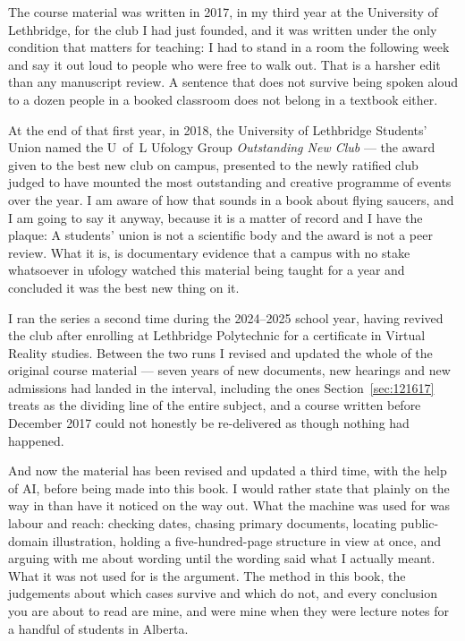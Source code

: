  The course material was written in 2017, in my
third year at the University of Lethbridge, for the club I had just founded, and it was written
under the only condition that matters for teaching: I had to stand in a room the following week
and say it out loud to people who were free to walk out. That is a harsher edit than any
manuscript review. A sentence that does not survive being spoken aloud to a dozen people in a
booked classroom does not belong in a textbook either.

At the end of that first year, in 2018, the University of Lethbridge Students' Union named the
U~of~L Ufology Group \emph{Outstanding New Club} --- the award given to the best new club on
campus, presented to the newly ratified club judged to have mounted the most outstanding and
creative programme of events over the year. I am aware of how that sounds in a book about flying
saucers, and I am going to say it anyway, because it is a matter of record and I have the plaque:
 A students' union is not a
scientific body and the award is not a peer review. What it is, is documentary evidence that a
campus with no stake whatsoever in ufology watched this material being taught for a year and
concluded it was the best new thing on it.

I ran the series a second time during the 2024--2025 school year, having revived the club after
enrolling at Lethbridge Polytechnic for a certificate in Virtual Reality studies. Between the two
runs I revised and updated the whole of the original course material --- seven years of new
documents, new hearings and new admissions had landed in the interval, including the ones
Section~\ref{sec:121617} treats as the dividing line of the entire subject, and a course written
before December 2017 could not honestly be re-delivered as though nothing had happened.

And now the material has been revised and updated a third time, with the help of AI, before being
made into this book. I would rather state that plainly on the way in than have it noticed on the
way out. What the machine was used for was labour and reach: checking dates, chasing primary
documents, locating public-domain illustration, holding a five-hundred-page structure in view at
once, and arguing with me about wording until the wording said what I actually meant. What it was
not used for is the argument. The method in this book, the judgements about which cases survive
and which do not, and every conclusion you are about to read are mine, and were mine when they
were lecture notes for a handful of students in Alberta.

